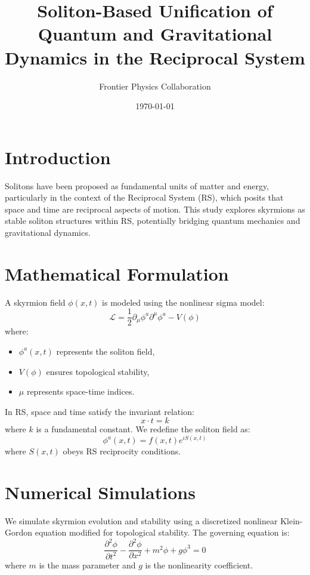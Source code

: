 \documentclass{article}
\title{Soliton-Based Unification of Quantum and Gravitational Dynamics in the Reciprocal System}
\author{Frontier Physics Collaboration}
\date{\today}
\begin{document}
\maketitle

\section{Introduction}
Solitons have been proposed as fundamental units of matter and energy, particularly in the context of the Reciprocal System (RS), which posits that space and time are reciprocal aspects of motion. This study explores skyrmions as stable soliton structures within RS, potentially bridging quantum mechanics and gravitational dynamics.

\section{Mathematical Formulation}
A skyrmion field $\phi(x,t)$ is modeled using the nonlinear sigma model:
\begin{equation}
\mathcal{L} = \frac{1}{2} \partial_{\mu} \phi^a \partial^{\mu} \phi^a - V(\phi)
\end{equation}
where:
\begin{itemize}
    \item $\phi^a(x,t)$ represents the soliton field,
    \item $V(\phi)$ ensures topological stability,
    \item $\mu$ represents space-time indices.
\end{itemize}
In RS, space and time satisfy the invariant relation:
\begin{equation}
    x \cdot t = k
\end{equation}
where $k$ is a fundamental constant. We redefine the soliton field as:
\begin{equation}
    \phi^a(x,t) = f(x,t) e^{i S(x,t)}
\end{equation}
where $S(x,t)$ obeys RS reciprocity conditions.

\section{Numerical Simulations}

We simulate skyrmion evolution and stability using a discretized nonlinear Klein-Gordon equation modified for topological stability. The governing equation is:
\begin{equation}
    \frac{\partial^2 \phi}{\partial t^2} - \frac{\partial^2 \phi}{\partial x^2} + m^2 \phi + g \phi^3 = 0
\end{equation}
where $m$ is the mass parameter and $g$ is the nonlinearity coefficient.
\end{document}
